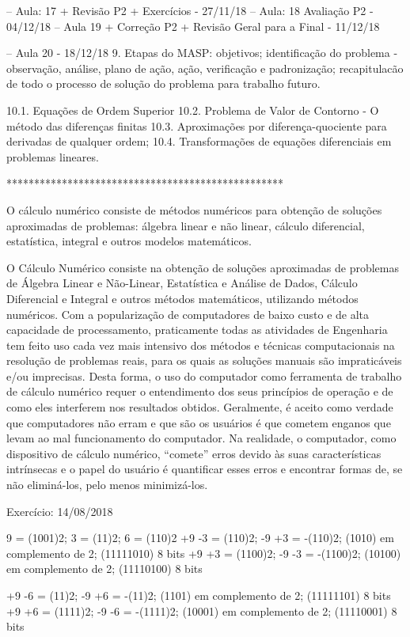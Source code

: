 -- Aula: 17 + Revisão P2 + Exercícios - 27/11/18
-- Aula: 18 Avaliação P2 - 04/12/18
-- Aula 19 + Correção P2 + Revisão Geral para a Final - 11/12/18

-- Aula 20 - 18/12/18
9. Etapas do MASP: objetivos; identificação do problema - observação, análise, plano de ação, ação, verificação e padronização; recapitulacão de todo o processo de solução do problema para trabalho futuro.

10.1. Equações de Ordem Superior
10.2. Problema de Valor de Contorno - O método das diferenças finitas
10.3. Aproximações por diferença-quociente para derivadas de qualquer ordem; 
10.4. Transformações de equações diferenciais em problemas lineares. 

**************************************************

O cálculo numérico consiste de métodos numéricos para obtenção de soluções aproximadas de problemas: álgebra linear e não linear, cálculo diferencial, estatística, integral e outros modelos matemáticos.

O Cálculo Numérico consiste na obtenção de soluções aproximadas de problemas de Álgebra Linear e Não-Linear, Estatística e Análise de Dados, Cálculo Diferencial e Integral e outros métodos matemáticos, utilizando métodos numéricos. Com a popularização de computadores de baixo custo e de alta capacidade de processamento, praticamente todas as atividades de Engenharia tem feito uso cada vez mais intensivo dos métodos e técnicas computacionais na resolução de problemas reais, para os quais as soluções manuais são impraticáveis e/ou imprecisas. Desta forma, o uso do computador como ferramenta de trabalho de cálculo numérico requer o entendimento dos seus princípios de operação e de como eles interferem nos resultados obtidos. Geralmente, é aceito como verdade que computadores não erram e que são os usuários é que cometem enganos que levam ao mal funcionamento do computador. Na realidade, o computador, como dispositivo de cálculo numérico, “comete” erros devido às suas características intrínsecas e o papel do usuário é quantificar esses erros e encontrar formas de, se não eliminá-los, pelo menos minimizá-los.

Exercício: 14/08/2018

 9 = (1001)2; 3 = (11)2; 6 = (110)2
+9 -3 =  (110)2; 
-9 +3 = -(110)2;  (1010)  em complemento de 2; (11111010) 8 bits
+9 +3 =  (1100)2;
-9 -3 = -(1100)2; (10100) em complemento de 2; (11110100) 8 bits

+9 -6 =  (11)2;
-9 +6 = -(11)2; (1101) em complemento de 2; (11111101) 8 bits
+9 +6 =  (1111)2;
-9 -6 = -(1111)2; (10001) em complemento de 2; (11110001) 8 bits

